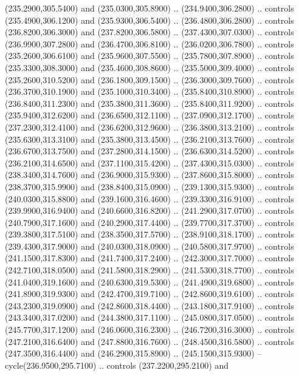 {\begin{scope}[y=0.80pt, x=0.80pt, yscale=-1, xscale=1, inner sep=0pt, outer sep=0pt, #1]
      (235.2900,305.5400) and (235.0300,305.8900) .. (234.9400,306.2800) .. controls
      (235.4900,306.1200) and (235.9300,306.5400) .. (236.4800,306.2800) .. controls
      (236.8200,306.3000) and (237.8200,306.5800) .. (237.4300,307.0300) .. controls
      (236.9900,307.2800) and (236.4700,306.8100) .. (236.0200,306.7800) .. controls
      (235.2600,306.6100) and (235.9600,307.5500) .. (235.7800,307.8900) .. controls
      (235.3300,308.3000) and (235.4600,308.8600) .. (235.5000,309.4000) .. controls
      (235.2600,310.5200) and (236.1800,309.1500) .. (236.3000,309.7600) .. controls
      (236.3700,310.1900) and (235.1000,310.3400) .. (235.8400,310.8900) .. controls
      (236.8400,311.2300) and (235.3800,311.3600) .. (235.8400,311.9200) .. controls
      (235.9400,312.6200) and (236.6500,312.1100) .. (237.0900,312.1700) .. controls
      (237.2300,312.4100) and (236.6200,312.9600) .. (236.3800,313.2100) .. controls
      (235.6300,313.3100) and (235.3800,313.4500) .. (236.2100,313.7600) .. controls
      (236.6700,313.7500) and (237.2800,314.1500) .. (236.6300,314.5200) .. controls
      (236.2100,314.6500) and (237.1100,315.4200) .. (237.4300,315.0300) .. controls
      (238.3400,314.7600) and (236.9000,315.9300) .. (237.8600,315.8000) .. controls
      (238.3700,315.9900) and (238.8400,315.0900) .. (239.1300,315.9300) .. controls
      (240.0300,315.8800) and (239.1600,316.4600) .. (239.3300,316.9100) .. controls
      (239.9900,316.9400) and (240.6600,316.8200) .. (241.2900,317.0700) .. controls
      (240.7900,317.1600) and (240.2900,317.4400) .. (239.7700,317.3700) .. controls
      (239.3800,317.5100) and (238.3500,317.5700) .. (238.9100,318.1700) .. controls
      (239.4300,317.9000) and (240.0300,318.0900) .. (240.5800,317.9700) .. controls
      (241.1500,317.8300) and (241.7400,317.2400) .. (242.3000,317.7000) .. controls
      (242.7100,318.0500) and (241.5800,318.2900) .. (241.5300,318.7700) .. controls
      (241.0400,319.1600) and (240.6300,319.5300) .. (241.4900,319.6800) .. controls
      (241.8900,319.9300) and (242.4700,319.7100) .. (242.8600,319.6100) .. controls
      (243.2300,319.0900) and (242.8600,318.4400) .. (243.1800,317.9100) .. controls
      (243.3400,317.0200) and (244.3800,317.1100) .. (245.0800,317.0500) .. controls
      (245.7700,317.1200) and (246.0600,316.2300) .. (246.7200,316.3000) .. controls
      (247.2100,316.6400) and (247.8800,316.7600) .. (248.4500,316.5800) .. controls
      (247.3500,316.4400) and (246.2900,315.8900) .. (245.1500,315.9300) --
      cycle(236.9500,295.7100) .. controls (237.2200,295.2100) and

\end{scope}}
